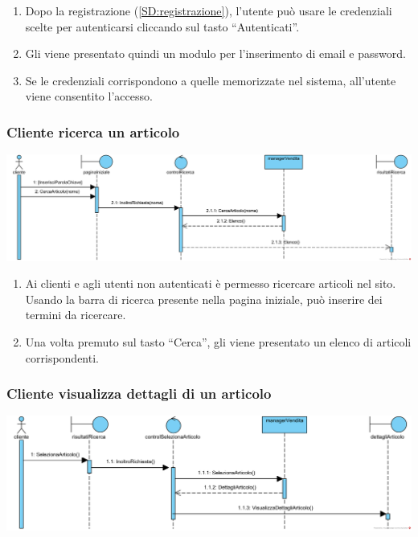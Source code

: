 \documentclass[12pt,a4paper]{article}
\begin{document}
\begin{enumerate}
\item Dopo la registrazione (\ref{SD:registrazione}), l'utente può usare le credenziali scelte per autenticarsi cliccando sul tasto ``Autenticati''.
\item Gli viene presentato quindi un modulo per l'inserimento di email e password.
\item Se le credenziali corrispondono a quelle memorizzate nel sistema, all'utente viene consentito l'accesso.
\end{enumerate}

\subsubsection{Cliente ricerca un articolo}
\label{SD:ricerca}

\begin{center}
\includegraphics[width=\textwidth]{SequenceDiagram/ClienteArticoloRicerca}
\end{center}

\begin{enumerate}
\item Ai clienti e agli utenti non autenticati è permesso ricercare articoli nel sito. Usando la barra di ricerca presente nella pagina iniziale, può inserire dei termini da ricercare.
\item Una volta premuto sul tasto ``Cerca'', gli viene presentato un elenco di articoli corrispondenti.
\end{enumerate}

\subsubsection{Cliente visualizza dettagli di un articolo}
\label{SD:dettagli}

\begin{center}
\includegraphics[width=\textwidth]{SequenceDiagram/ClienteArticoloSeleziona}
\end{center}
\end{document}
